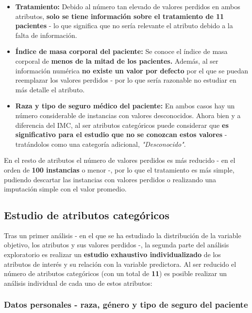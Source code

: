 \begin{itemize}
	\item \textbf{Tratamiento:} Debido al número tan elevado de valores perdidos en ambos atributos, \textbf{solo se tiene información sobre el tratamiento de 11 pacientes} - lo que significa que no sería relevante el atributo debido a la falta de información.
	\item \textbf{Índice de masa corporal del paciente:} Se conoce el índice de masa corporal de \textbf{menos de la mitad de los pacientes.}  Además, al ser información numérica \textbf{no existe un valor por defecto} por el que se puedan reemplazar los valores perdidos - por lo que sería razonable no estudiar en más detalle el atributo.
	\item \textbf{Raza y tipo de seguro médico del paciente:} En ambos casos hay un número considerable de instancias con valores desconocidos. Ahora bien y a diferencia del IMC, al ser atributos categóricos puede considerar que \textbf{es significativo para el estudio que no se conozcan estos valores} - tratándolos como una categoría adicional, \textit{"Desconocido"}.
\end{itemize}

En el resto de atributos el número de valores perdidos es más reducido - en el orden de \textbf{100 instancias} o menor -, por lo que el tratamiento es más simple, pudiendo descartar las instancias con valores perdidos o realizando una imputación simple con el valor promedio.

\subsection{Estudio de atributos categóricos}

Tras un primer análisis - en el que se ha estudiado la distribución de la variable objetivo, los atributos y sus valores perdidos -, la segunda parte del análisis exploratorio es realizar un \textbf{estudio exhaustivo individualizado} de los atributos de interés y su relación con la variable predictora. Al ser reducido el número de atributos categóricos (con un total de \textbf{11}) es posible realizar un análisis individual de cada uno de estos atributos:

\subsubsection{Datos personales - raza, género y tipo de seguro del paciente}

